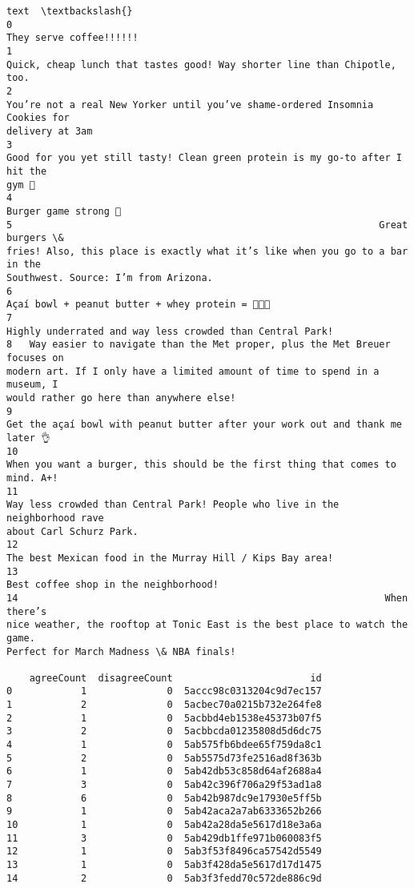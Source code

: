 \documentclass[11pt]{article}
\makeatletter
\newcommand{\boxspacing}{\kern\kvtcb@left@rule\kern\kvtcb@boxsep}
\newcommand{\prompt}[4]{
        \ttfamily\llap{{\color{#2}[#3]:\hspace{3pt}#4}}\vspace{-\baselineskip}
    }
\makeatother
\begin{document}
            \begin{tcolorbox}[breakable, size=fbox, boxrule=.5pt, pad at break*=1mm, opacityfill=0]
\prompt{Out}{outcolor}{37}{\boxspacing}
\begin{Verbatim}[commandchars=\\\{\}]
                               text  \textbackslash{}
0
They serve coffee!!!!!!
1
Quick, cheap lunch that tastes good! Way shorter line than Chipotle, too.
2
You’re not a real New Yorker until you’ve shame-ordered Insomnia Cookies for
delivery at 3am
3
Good for you yet still tasty! Clean green protein is my go-to after I hit the
gym 💪
4
Burger game strong 💪
5                                                                Great burgers \&
fries! Also, this place is exactly what it’s like when you go to a bar in the
Southwest. Source: I’m from Arizona.
6
Açaí bowl + peanut butter + whey protein = 💪💪💪
7
Highly underrated and way less crowded than Central Park!
8   Way easier to navigate than the Met proper, plus the Met Breuer focuses on
modern art. If I only have a limited amount of time to spend in a museum, I
would rather go here than anywhere else!
9
Get the açaí bowl with peanut butter after your work out and thank me later 👌
10
When you want a burger, this should be the first thing that comes to mind. A+!
11
Way less crowded than Central Park! People who live in the neighborhood rave
about Carl Schurz Park.
12
The best Mexican food in the Murray Hill / Kips Bay area!
13
Best coffee shop in the neighborhood!
14                                                                When there’s
nice weather, the rooftop at Tonic East is the best place to watch the game.
Perfect for March Madness \& NBA finals!

    agreeCount  disagreeCount                        id
0            1              0  5accc98c0313204c9d7ec157
1            2              0  5acbec70a0215b732e264fe8
2            1              0  5acbbd4eb1538e45373b07f5
3            2              0  5acbbcda01235808d5d6dc75
4            1              0  5ab575fb6bdee65f759da8c1
5            2              0  5ab5575d73fe2516ad8f363b
6            1              0  5ab42db53c858d64af2688a4
7            3              0  5ab42c396f706a29f53ad1a8
8            6              0  5ab42b987dc9e17930e5ff5b
9            1              0  5ab42aca2a7ab6333652b266
10           1              0  5ab42a28da5e5617d18e3a6a
11           3              0  5ab429db1ffe971b060083f5
12           1              0  5ab3f53f8496ca57542d5549
13           1              0  5ab3f428da5e5617d17d1475
14           2              0  5ab3f3fedd70c572de886c9d
\end{Verbatim}
\end{tcolorbox}
        
\end{document}
